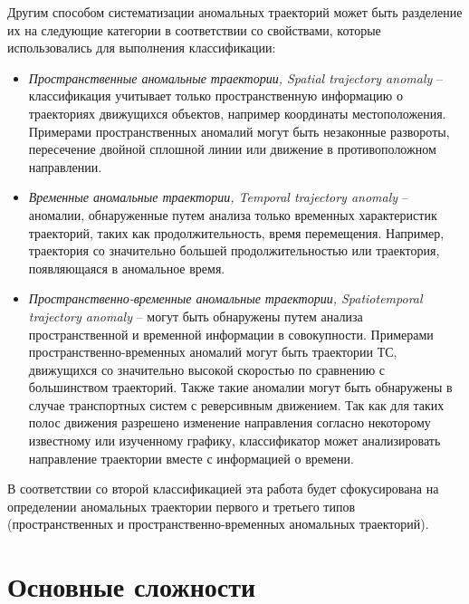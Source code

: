 Другим способом систематизации аномальных траекторий может быть разделение их на следующие категории в соответствии со свойствами, которые использовались для выполнения классификации:

\begin{itemize}
	\setlength\itemsep{-0.5em}
	\item \textit{Пространственные аномальные траектории, Spatial trajectory anomaly} -- классификация учитывает только пространственную информацию о траекториях движущихся объектов, например координаты местоположения. Примерами пространственных аномалий могут быть незаконные развороты, пересечение двойной сплошной линии или движение в противоположном направлении.
	\item \textit{Временные аномальные траектории, Temporal trajectory anomaly} -- аномалии, обнаруженные путем анализа только временных характеристик траекторий, таких как продолжительность, время перемещения. Например, траектория со значительно большей продолжительностью или траектория, появляющаяся в аномальное время.
	\item \textit{Пространственно-временные аномальные траектории, Spatiotemporal trajectory anomaly} -- могут быть обнаружены путем анализа пространственной и временной информации в совокупности. Примерами пространственно-временных аномалий могут быть траектории ТС, движущихся со значительно высокой скоростью по сравнению с большинством траекторий. Также такие аномалии могут быть обнаружены в случае транспортных систем с реверсивным движением. Так как для таких полос движения разрешено изменение направления согласно некоторому известному или изученному графику, классификатор может анализировать направление траектории вместе с информацией о времени.
\end{itemize}

В соответствии со второй классификацией эта работа будет сфокусирована на определении аномальных траектории первого и третьего типов (пространственных и пространственно-временных аномальных траекторий).

\section{Основные сложности}

